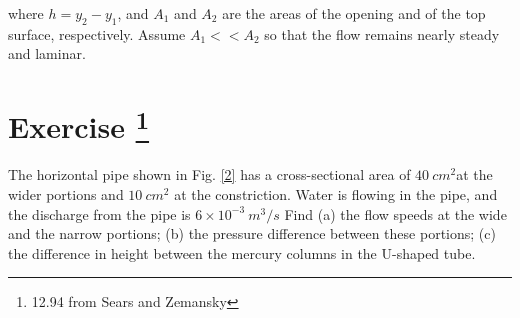 \documentclass[12pt]{article}
\begin{document}
where $h = y_2 - y_1$, and $A_1$ and $A_2$ are the areas of the
opening and of the top surface, respectively. Assume $A_1 << A_2$
so that the flow remains
nearly steady and laminar.






\section*{Exercise \theexample \footnote{12.94 from Sears and Zemansky}}

The horizontal pipe
shown in Fig. \ref{2} has
a cross-sectional area of
$40~cm^2$at the wider portions
and $10~cm^2$ at the constriction.
Water is flowing in the
pipe, and the discharge from
the pipe is $6\times10^{-3}~m^3/s$
Find (a) the flow
speeds at the wide and the narrow
portions; (b) the pressure difference between these portions;
(c) the difference in height between the mercury columns in the
U-shaped tube.
\end{document}
